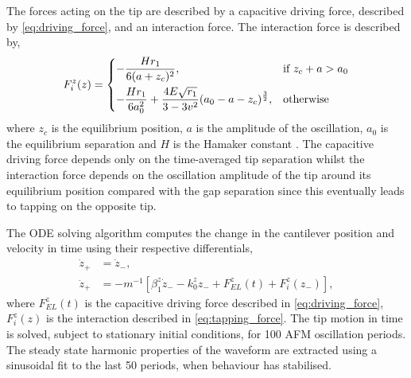 \documentclass{article}
\begin{document}
The forces acting on the tip are described by a capacitive driving force, described by \eqref{eq:driving_force}, and an interaction force. The interaction force is described by,
\begin{equation}
	F_i^z(z) =
	\begin{dcases}
	-\frac{H r_1}{6(a+z_c)^2}, & \text{if } z_c + a > a_0 \\
	-\frac{H r_1}{6a_0^2} + \frac{4E\sqrt{r_1}}{3 - 3v^2} (a_0-a-z_c)^{\frac{3}{2}}, & \text{otherwise}
	\end{dcases}
	\label{eq:tapping_force}
\end{equation}
where $z_c$ is the equilibrium position, $a$ is the amplitude of the oscillation, $a_0$ is the equilibrium separation and $H$ is the Hamaker constant \cite{tamayo1996deformation, garcia1999attractive, san2002unifying, lee2002nonlinear}. The capacitive driving force depends only on the time-averaged tip separation whilst the interaction force depends on the oscillation amplitude of the tip around its equilibrium position compared with the gap separation since this eventually leads to tapping on the opposite tip.

The ODE solving algorithm computes the change in the cantilever position and velocity in time using their respective differentials,
\begin{align}
	\dot{z}_+ &= \dot{z}_-, \\
	\ddot{z}_+ &= -m^{-1}\left[\beta_1^z\dot{z}_- - k_0^zz_- + F_{EL}^z(t) + F_i^z(z_-)\right],
\end{align}
where $F_{EL}^z(t)$ is the capacitive driving force described in \eqref{eq:driving_force}, $F_i^z(z)$ is the interaction described in \eqref{eq:tapping_force}. The tip motion in time is solved, subject to stationary initial conditions, for 100 AFM oscillation periods. The steady state harmonic properties of the waveform are extracted using a sinusoidal fit to the last 50 periods, when behaviour has stabilised.
\end{document}
